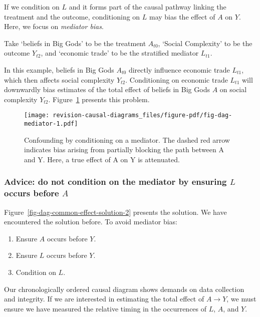 \documentclass[
  singlecolumn,
  9pt]{article}
\providecommand{\tightlist}{%
  \setlength{\itemsep}{0pt}\setlength{\parskip}{0pt}}\usepackage{longtable,booktabs,array}
\begin{document}
If we condition on \(L\) and it forms part of the causal pathway linking
the treatment and the outcome, conditioning on \(L\) may bias the effect
of \(A\) on \(Y\). Here, we focus on \emph{mediator bias}.

Take `beliefs in Big Gods' to be the treatment \(A_{t0}\), `Social
Complexity' to be the outcome \(Y_{t2}\), and `economic trade' to be the
stratified mediator \(L_{t1}\).

In this example, beliefs in Big Gods \(A_{t0}\) directly influence
economic trade \(L_{t1}\), which then affects social complexity
\(Y_{t2}\). Conditioning on economic trade \(L_{t1}\) will downwardly
bias estimates of the total effect of beliefs in Big Gods \(A\) on
social complexity \(Y_{t2}\). Figure~\ref{fig-dag-mediator} presents
this problem.

\begin{figure}

{\centering \texttt{[image: revision-causal-diagrams\_files/figure-pdf/fig-dag-mediator-1.pdf]}

}

\caption{\label{fig-dag-mediator}Confounding by conditioning on a
mediator. The dashed red arrow indicates bias arising from partially
blocking the path between A and Y. Here, a true effect of A on Y is
attenuated.}

\end{figure}

\subsubsection{\texorpdfstring{Advice: do not condition on the mediator
by ensuring \(L\) occurs before
\(A\)}{Advice: do not condition on the mediator by ensuring L occurs before A}}\label{advice-do-not-condition-on-the-mediator-by-ensuring-l-occurs-before-a}

Figure~\ref{fig-dag-common-effect-solution-2} presents the solution. We
have encountered the solution before. To avoid mediator bias:

\begin{enumerate}
\def\labelenumi{\arabic{enumi}.}
\tightlist
\item
  Ensure \(A\) occurs before \(Y\).
\item
  Ensure \(L\) occurs before \(Y\).
\item
  Condition on \(L\).
\end{enumerate}

Our chronologically ordered causal diagram shows demands on data
collection and integrity. If we are interested in estimating the total
effect of \(A\to Y\), we must ensure we have measured the relative
timing in the occurrences of \(L\), \(A\), and \(Y\).
\end{document}

